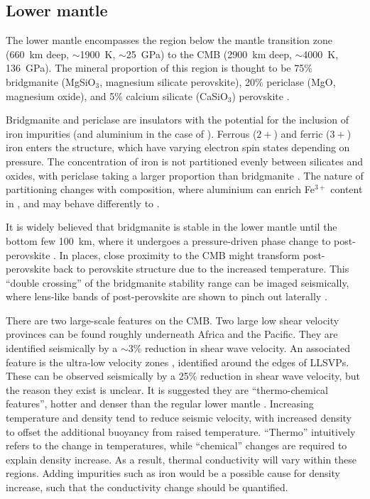 \subsection{\label{sec:LM}Lower mantle}

The lower mantle encompasses the region below the mantle transition zone (660~km deep, $\sim$1900~K, $\sim$25~GPa) to the CMB (2900~km deep, $\sim$4000~K, 136~GPa). The mineral proportion of this region is thought to be 75\% bridgmanite (MgSiO$_3$, magnesium silicate perovskite), 20\% periclase (MgO, magnesium oxide), and  5\% calcium silicate (CaSiO$_3$) perovskite \citep[][see Figure ~\ref{fig:tronnes_perid_comp}]{Lee2004,Tronnes2009}. 

Bridgmanite and periclase are insulators with the potential for the inclusion of iron impurities (and aluminium in the case of \bdg). Ferrous ($2+$) and ferric ($3+$) iron enters the \bdgs structure, which have varying electron spin states depending on pressure. The concentration of iron is not partitioned evenly between silicates and oxides, with periclase taking a larger proportion than bridgmanite \citep{Muir2016}. The nature of partitioning changes with composition, where aluminium can enrich Fe$^{3+}$ content in \bdgs \citep{McCammon1997}, and \ppvs may behave differently to \bdg.

It is widely believed that bridgmanite is stable in the lower mantle until the bottom few 100~km, where it undergoes a pressure-driven phase change to post-perovskite \citep{Murakami2004,Oganov2004}. In places, close proximity to the CMB might transform post-perovskite back to perovskite structure due to the increased temperature. This ``double crossing'' of the bridgmanite stability range can be imaged seismically, where lens-like bands of post-perovskite are shown to pinch out laterally \citep{Lay2006}.

There are two large-scale features on the CMB. Two large low shear velocity provinces \citep[LLSVPs, see][]{Garnero2008} can be found roughly underneath Africa and the Pacific. They are identified seismically by a $\sim$3\% reduction in shear wave velocity. An associated feature is the ultra-low velocity zones \citep[ULVZs, see][]{Rost2005}, identified around the edges of LLSVPs. These can be observed seismically by a 25\% reduction in shear wave velocity, but the reason they exist is unclear. It is suggested they are ``thermo-chemical features'', hotter and denser than the regular lower mantle \citep{Garnero2008}. Increasing temperature and density tend to reduce seismic velocity, with increased density to offset the additional buoyancy from raised temperature. ``Thermo'' intuitively refers to the change in temperatures, while ``chemical'' changes are required to explain density increase. As a result, thermal conductivity will vary within these regions. Adding impurities such as iron would be a possible cause for density increase, such that the conductivity change should be quantified.

